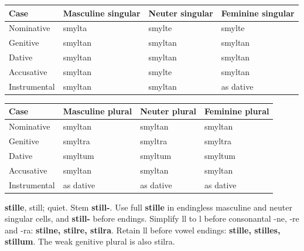 \par\begingroup
\fontsize{10.5}{13.2}\selectfont
\setlength{\LTleft}{0pt}\setlength{\LTright}{\fill}
\noindent
\begin{tabular}{@{}>{\raggedright\arraybackslash}p{22.0mm}>{\raggedright\arraybackslash}p{31.188mm}>{\raggedright\arraybackslash}p{31.188mm}>{\raggedright\arraybackslash}p{31.188mm}@{}}
\toprule
\textbf{Case} & \textbf{Masculine singular} & \textbf{Neuter singular} & \textbf{Feminine singular} \\
\midrule
Nominative & smylta & smylte & smylte \\
Genitive & smyltan & smyltan & smyltan \\
Dative & smyltan & smyltan & smyltan \\
Accusative & smyltan & smylte & smyltan \\
Instrumental & smyltan & smyltan & as dative \\
\bottomrule
\end{tabular}
\par\endgroup
\par\addvspace{5pt}
\par\begingroup
\fontsize{10.5}{13.2}\selectfont
\setlength{\LTleft}{0pt}\setlength{\LTright}{\fill}
\noindent
\begin{tabular}{@{}>{\raggedright\arraybackslash}p{22.0mm}>{\raggedright\arraybackslash}p{31.188mm}>{\raggedright\arraybackslash}p{31.188mm}>{\raggedright\arraybackslash}p{31.188mm}@{}}
\toprule
\textbf{Case} & \textbf{Masculine plural} & \textbf{Neuter plural} & \textbf{Feminine plural} \\
\midrule
Nominative & smyltan & smyltan & smyltan \\
Genitive & smyltra & smyltra & smyltra \\
Dative & smyltum & smyltum & smyltum \\
Accusative & smyltan & smyltan & smyltan \\
Instrumental & as dative & as dative & as dative \\
\bottomrule
\end{tabular}
\par\endgroup

\textbf{stille}, still; quiet. Stem \textbf{still-}. Use full \textbf{stille} in endingless masculine and neuter singular cells, and \textbf{still-} before endings. Simplify ll to l before consonantal -ne, -re and -ra: \textbf{stilne, stilre, stilra}. Retain ll before vowel endings: \textbf{stille, stilles, stillum}. The weak genitive plural is also stilra.

